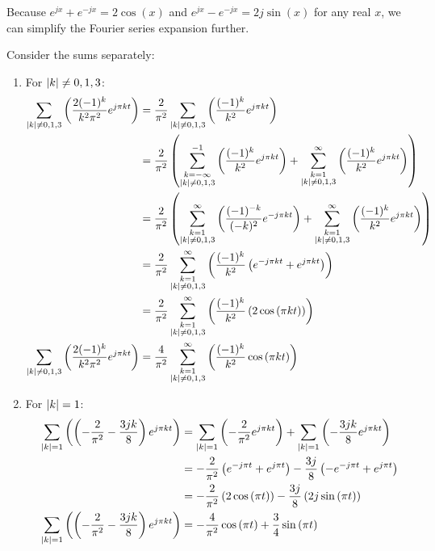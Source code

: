 \documentclass[a4paper, 10pt]{article}
\begin{document}
\begin{tosubmit}
\newpage

Because \( e^{jx} + e^{-jx} = 2\cos{(x)} \) and \( e^{jx} - e^{-jx} = 2j\sin{(x)} \) for any real \( x \), we can simplify the Fourier series expansion further.

\vspace{3mm}

Consider the sums separately:
\begin{enumerate}
    \item For \( \left| k \right| \neq 0, 1, 3 \):
    \begin{align*}
        \sum_{\left| k \right| \neq 0, 1, 3} \left( \frac{2 (-1)^k}{k^2 \pi^2} e^{ j \pi k t} \right) &= \frac{2}{\pi^2} \sum_{\left| k \right| \neq 0, 1, 3} \left( \frac{(-1)^k}{k^2} e^{ j \pi k t} \right) \\
        &= \frac{2}{\pi^2} \left( \sum_{\substack{ k = -\infty \\ \left| k \right| \neq 0, 1, 3 }}^{-1} \left( \frac{(-1)^k}{k^2} e^{ j \pi k t} \right) + \sum_{\substack{ k = 1 \\ \left| k \right| \neq 0, 1, 3 }}^{\infty} \left( \frac{(-1)^k}{k^2} e^{ j \pi k t} \right) \right) \\
        &= \frac{2}{\pi^2} \left( \sum_{\substack{ k = 1 \\ \left| k \right| \neq 0, 1, 3 }}^{\infty} \left( \frac{(-1)^{-k}}{(-k)^2} e^{ -j \pi k t} \right) + \sum_{\substack{ k = 1 \\ \left| k \right| \neq 0, 1, 3 }}^{\infty} \left( \frac{(-1)^k}{k^2} e^{ j \pi k t} \right) \right) \\
        &= \frac{2}{\pi^2} \sum_{\substack{ k = 1 \\ \left| k \right| \neq 0, 1, 3 }}^{\infty} \left( \frac{(-1)^{k}}{k^2} \left( e^{ -j \pi k t} + e^{ j \pi k t} \right) \right) \\
        &= \frac{2}{\pi^2} \sum_{\substack{ k = 1 \\ \left| k \right| \neq 0, 1, 3 }}^{\infty} \left( \frac{(-1)^{k}}{k^2} \left( 2\cos{(\pi k t)} \right) \right) \\
        \sum_{\left| k \right| \neq 0, 1, 3} \left( \frac{2 (-1)^k}{k^2 \pi^2} e^{ j \pi k t} \right) &= \frac{4}{\pi^2} \sum_{\substack{ k = 1 \\ \left| k \right| \neq 0, 1, 3 }}^{\infty} \left( \frac{(-1)^{k}}{k^2} \cos{(\pi k t)} \right)
    \end{align*}

    \item For \( \left| k \right| = 1 \):
    \begin{align*}
        \sum_{\left| k \right| = 1} \left( \left( -\frac{2}{\pi^2} - \frac{3jk}{8} \right) e^{ j \pi k t}\right) &= \sum_{\left| k \right| = 1} \left( -\frac{2}{\pi^2} e^{ j \pi k t} \right) + \sum_{\left| k \right| = 1} \left( - \frac{3jk}{8} e^{ j \pi k t} \right) \\
        &= -\frac{2}{\pi^2} \left( e^{-j \pi t} + e^{j \pi t} \right) - \frac{3j}{8} \left( -e^{-j \pi t} + e^{j \pi t} \right) \\
        &= -\frac{2}{\pi^2} \left( 2\cos{(\pi t)} \right) - \frac{3j}{8} \left( 2j\sin{(\pi t)} \right) \\
        \sum_{\left| k \right| = 1} \left( \left( -\frac{2}{\pi^2} - \frac{3jk}{8} \right) e^{ j \pi k t}\right) &= -\frac{4}{\pi^2} \cos{(\pi t)} + \frac{3}{4} \sin{(\pi t)}
    \end{align*}


\end{enumerate}
\end{tosubmit}
\end{document}
